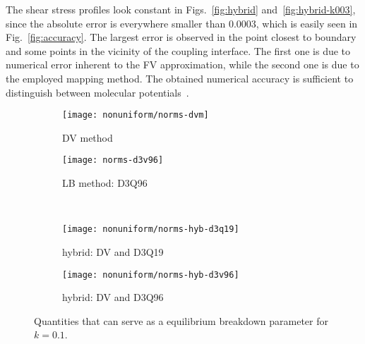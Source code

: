\documentclass[]{elsarticle} %
\begin{document}
The shear stress profiles look constant in Figs.~\ref{fig:hybrid} and~\ref{fig:hybrid-k003},
since the absolute error is everywhere smaller than 0.0003, which is easily seen in Fig.~\ref{fig:accuracy}.
The largest error is observed in the point closest to boundary and some points in the vicinity of the coupling interface.
The first one is due to numerical error inherent to the FV approximation,
while the second one is due to the employed mapping method.
The obtained numerical accuracy is sufficient to distinguish between molecular potentials~\cite{Sharipov2013, Su2018}.


\begin{figure}
    \centering
    \begin{subfigure}[b]{0.5\textwidth}
        \texttt{[image: nonuniform/norms-dvm]}
        \caption{DV method}
        \label{fig:norms:dvm}
    \end{subfigure}%
    \begin{subfigure}[b]{0.5\textwidth}
        \texttt{[image: norms-d3v96]}
        \caption{LB method: D3Q96}
        \label{fig:norms:d3q96}
    \end{subfigure}\\
    \begin{subfigure}[b]{0.5\textwidth}
        \texttt{[image: nonuniform/norms-hyb-d3q19]}
        \caption{hybrid: DV and D3Q19}
        \label{fig:norms:d3q19-hyb}
    \end{subfigure}%
    \begin{subfigure}[b]{0.5\textwidth}
        \texttt{[image: nonuniform/norms-hyb-d3v96]}
        \caption{hybrid: DV and D3Q96}
        \label{fig:norms:d3q96-hyb}
    \end{subfigure}
    \caption{
       Quantities that can serve as a equilibrium breakdown parameter for \(k=0.1\).
    }\label{fig:norms}
\end{figure}
\end{document}
